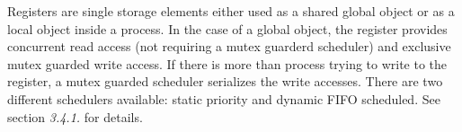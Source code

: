 \documentclass[a4paper,12pt,twoside,english]{article}
\begin{document}
\begin{algorithm}
\let\normalsize\footnotesize \normalsize
\algcontent
\algdescription

\end{algorithm}



\def\thesubsubsection{\tocXVI}
\secIII{\label{toclabelXVI}\thesubsubsection}
Registers are single storage elements either used as a shared global object or as a local object
inside a process. In the case of a global object, the register provides concurrent read access (not requiring a mutex guarderd scheduler)  and exclusive mutex
guarded write access. If there is more than process trying to write to the register, a mutex guarded scheduler serializes the write accesses. There are two
different schedulers available: static priority and dynamic FIFO scheduled. See section {\it 3.4.1.} for details.


\vskip5pt
\end{document}
